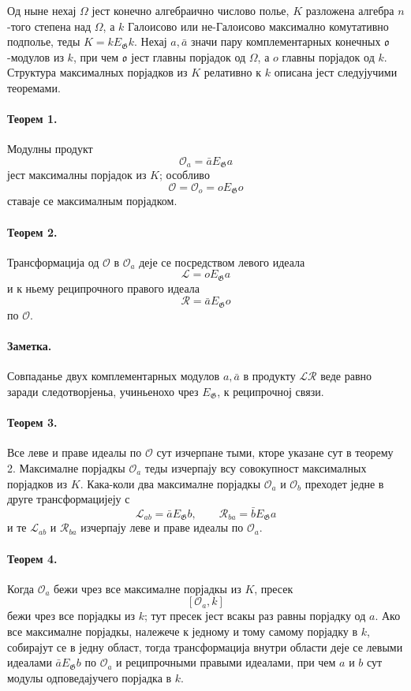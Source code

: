 ﻿\documentclass[11pt]{article}
\providecommand{\Gg}{\mathfrak G}
\providecommand{\oo}{\mathfrak o}
\begin{document}
Од ныне нехај \(\Omega\) јест конечно алгебраично числово полье, \(K\) разложена алгебра \(n\)-того степена над \(\Omega\), а \(k\) Галоисово или не-Галоисово максимално комутативно подполье, теды \(K=kE_\Gg k\). Нехај \(a,\bar a\) значи пару комплементарных конечных \(\oo\)-модулов из \(k\), при чем \(\oo\) јест главны порјадок од \(\Omega\), а \(o\) главны порјадок од \(k\). Структура максималных порјадков из \(K\) релативно к \(k\) описана јест следујучими теоремами.

\paragraph{Теорем 1.}
Модулны продукт
\[
        \mathcal O_a=\bar a E_\Gg a
\]
јест максималны порјадок из \(K\); особливо
\[
        \mathcal O=\mathcal O_o=oE_\Gg o
\]
ставаје се максималным порјадком.

\paragraph{Теорем 2.}
Трансформација од \(\mathcal O\) в \(\mathcal O_a\) деје се посредством левого идеала
\[
        \mathcal L=oE_\Gg a
\]
и к ньему реципрочного правого идеала
\[
        \mathcal R=\bar a E_\Gg o
\]
по \(\mathcal O\).

\paragraph{Заметка.}
Совпаданье двух комплементарных модулов \(a,\bar a\) в продукту \(\mathcal L\mathcal R\) веде равно заради следотворјеньа, учиньенохо чрез \(E_\Gg\), к реципрочној связи.

\paragraph{Теорем 3.}
Все леве и праве идеалы по \(\mathcal O\) сут изчерпане тыми, кторе указане сут в теорему 2. Максималне порјадкы \(\mathcal O_a\) теды изчерпају всу совокупност максималных порјадков из \(K\). Кака-коли два максималне порјадкы \(\mathcal O_a\) и \(\mathcal O_b\) преходет једне в друге трансформацијеју с
\[
        \mathcal L_{ab}=\bar aE_\Gg b,
        \qquad
        \mathcal R_{ba}=\bar bE_\Gg a
\]
и те \(\mathcal L_{ab}\) и \(\mathcal R_{ba}\) изчерпају леве и праве идеалы по \(\mathcal O_a\).

\paragraph{Теорем 4.}
Когда \(\mathcal O_a\) бежи чрез все максималне порјадкы из \(K\), пресек
\[
        [\mathcal O_a,k]
\]
бежи чрез все порјадкы из \(k\); тут пресек јест всакы раз равны порјадку од \(a\). Ако все максималне порјадкы, належече к једному и тому самому порјадку в \(k\), собирајут се в једну област, тогда трансформација внутри области деје се левыми идеалами \(\bar aE_\Gg b\) по \(\mathcal O_a\) и реципрочными правыми идеалами, при чем \(a\) и \(b\) сут модулы одповедајучего порјадка в \(k\).
\end{document}
